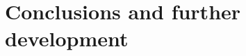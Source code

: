 \def\baselinestretch{1}
\chapter{Conclusions and further development}
\ifpdf
    \graphicspath{{Conclusions/ConclusionsFigs/PNG/}{Conclusions/ConclusionsFigs/PDF/}{Conclusions/ConclusionsFigs/}}
\else
    \graphicspath{{Conclusions/ConclusionsFigs/EPS/}{Conclusions/ConclusionsFigs/}}
\fi

\def\baselinestretch{1.66}





